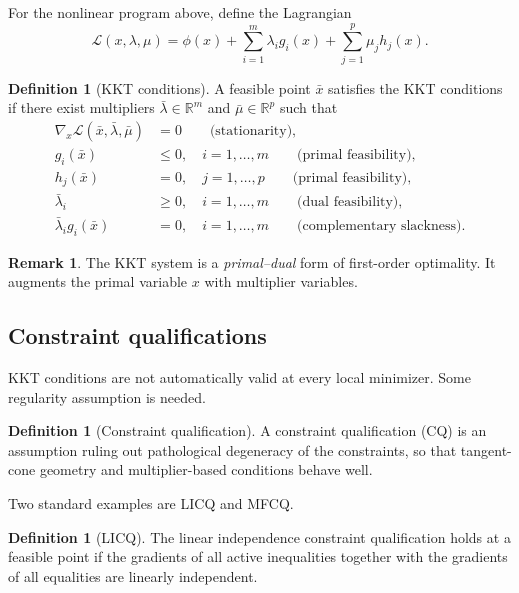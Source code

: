 \documentclass[pdflatex,sn-mathphys-num]{sn-jnl}%
\theoremstyle{definition}
\newtheorem{definition}[theorem]{Definition}
\newtheorem{remark}[theorem]{Remark}
\begin{document}
For the nonlinear program above, define the Lagrangian
\[
\mathcal{L}(x,\lambda,\mu)
=
\phi(x)+\sum_{i=1}^m \lambda_i g_i(x)+\sum_{j=1}^p \mu_j h_j(x).
\]

\begin{definition}[KKT conditions]
A feasible point $\bar x$ satisfies the KKT conditions if there exist
multipliers $\bar\lambda\in\mathbb{R}^m$ and $\bar\mu\in\mathbb{R}^p$ such that
\begin{align*}
\nabla_x \mathcal{L}(\bar x,\bar\lambda,\bar\mu)&=0
\qquad\text{(stationarity)},\\
g_i(\bar x)&\le 0,\quad i=1,\dots,m
\qquad\text{(primal feasibility)},\\
h_j(\bar x)&=0,\quad j=1,\dots,p
\qquad\text{(primal feasibility)},\\
\bar\lambda_i&\ge 0,\quad i=1,\dots,m
\qquad\text{(dual feasibility)},\\
\bar\lambda_i g_i(\bar x)&=0,\quad i=1,\dots,m
\qquad\text{(complementary slackness)}.
\end{align*}
\end{definition}

\begin{remark}
The KKT system is a \emph{primal--dual} form of first-order optimality.
It augments the primal variable $x$ with multiplier variables.
\end{remark}

\subsection{Constraint qualifications}

KKT conditions are not automatically valid at every local minimizer. Some
regularity assumption is needed.

\begin{definition}[Constraint qualification]
A constraint qualification (CQ) is an assumption ruling out pathological
degeneracy of the constraints, so that tangent-cone geometry and
multiplier-based conditions behave well.
\end{definition}

Two standard examples are LICQ and MFCQ.

\begin{definition}[LICQ]
The linear independence constraint qualification holds at a feasible point
if the gradients of all active inequalities together with the gradients of all
equalities are linearly independent.
\end{definition}
\end{document}
